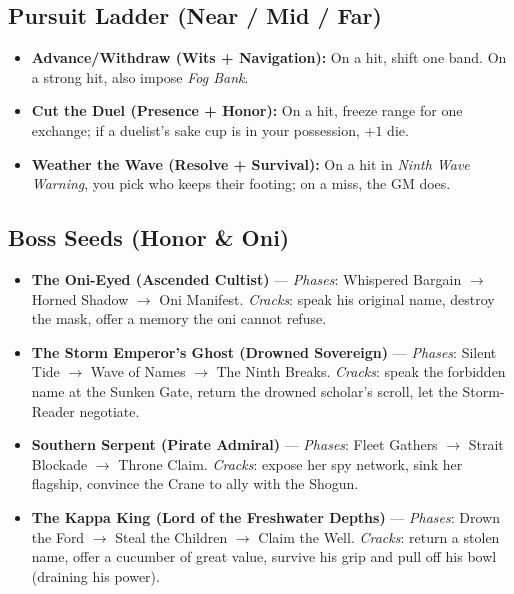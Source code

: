 \subsection*{Pursuit Ladder (Near / Mid / Far)}
\begin{itemize}
\item \textbf{Advance/Withdraw (Wits + Navigation):} On a hit, shift one band. On a strong hit, also impose \emph{Fog Bank}.
\item \textbf{Cut the Duel (Presence + Honor):} On a hit, freeze range for one exchange; if a duelist's sake cup is in your possession, $+1$ die.
\item \textbf{Weather the Wave (Resolve + Survival):} On a hit in \emph{Ninth Wave Warning}, you pick who keeps their footing; on a miss, the GM does.
\end{itemize}

\subsection*{Boss Seeds (Honor \& Oni)}
\begin{itemize}
\item \textbf{The Oni-Eyed (Ascended Cultist)} --- \emph{Phases}: Whispered Bargain $\rightarrow$ Horned Shadow $\rightarrow$ Oni Manifest. \emph{Cracks}: speak his original name, destroy the mask, offer a memory the oni cannot refuse.
\item \textbf{The Storm Emperor's Ghost (Drowned Sovereign)} --- \emph{Phases}: Silent Tide $\rightarrow$ Wave of Names $\rightarrow$ The Ninth Breaks. \emph{Cracks}: speak the forbidden name at the Sunken Gate, return the drowned scholar's scroll, let the Storm-Reader negotiate.
\item \textbf{Southern Serpent (Pirate Admiral)} --- \emph{Phases}: Fleet Gathers $\rightarrow$ Strait Blockade $\rightarrow$ Throne Claim. \emph{Cracks}: expose her spy network, sink her flagship, convince the Crane to ally with the Shogun.
\item \textbf{The Kappa King (Lord of the Freshwater Depths)} --- \emph{Phases}: Drown the Ford $\rightarrow$ Steal the Children $\rightarrow$ Claim the Well. \emph{Cracks}: return a stolen name, offer a cucumber of great value, survive his grip and pull off his bowl (draining his power).
\end{itemize}

